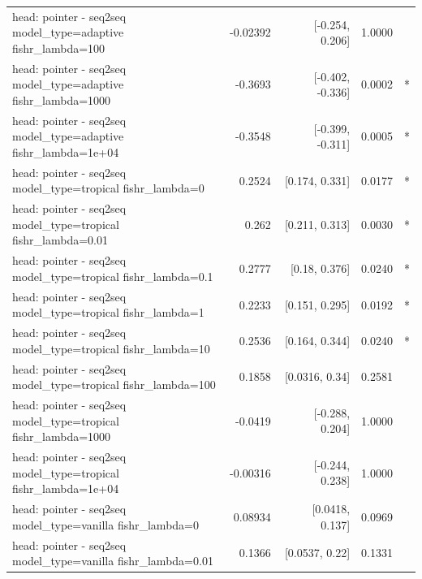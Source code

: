 \documentclass[10pt]{article}
\makeatletter
\newcommand{\stackcell}[1]{\begin{tabular}[t]{@{}l@{}}#1\end{tabular}}
\makeatother
\begin{document}
{\begin{longtable}{lrrrl}
\stackcell{head: pointer - seq2seq\\\footnotesize model\_type=adaptive fishr\_lambda=100 } & -0.02392 & [-0.254, 0.206] & 1.0000 & \\
\stackcell{head: pointer - seq2seq\\\footnotesize model\_type=adaptive fishr\_lambda=1000 } & -0.3693 & [-0.402, -0.336] & 0.0002 & *\\
\stackcell{head: pointer - seq2seq\\\footnotesize model\_type=adaptive fishr\_lambda=1e+04 } & -0.3548 & [-0.399, -0.311] & 0.0005 & *\\
\stackcell{head: pointer - seq2seq\\\footnotesize model\_type=tropical fishr\_lambda=0 } & 0.2524 & [0.174, 0.331] & 0.0177 & *\\
\stackcell{head: pointer - seq2seq\\\footnotesize model\_type=tropical fishr\_lambda=0.01 } & 0.262 & [0.211, 0.313] & 0.0030 & *\\
\stackcell{head: pointer - seq2seq\\\footnotesize model\_type=tropical fishr\_lambda=0.1 } & 0.2777 & [0.18, 0.376] & 0.0240 & *\\
\stackcell{head: pointer - seq2seq\\\footnotesize model\_type=tropical fishr\_lambda=1 } & 0.2233 & [0.151, 0.295] & 0.0192 & *\\
\stackcell{head: pointer - seq2seq\\\footnotesize model\_type=tropical fishr\_lambda=10 } & 0.2536 & [0.164, 0.344] & 0.0240 & *\\
\stackcell{head: pointer - seq2seq\\\footnotesize model\_type=tropical fishr\_lambda=100 } & 0.1858 & [0.0316, 0.34] & 0.2581 & \\
\stackcell{head: pointer - seq2seq\\\footnotesize model\_type=tropical fishr\_lambda=1000 } & -0.0419 & [-0.288, 0.204] & 1.0000 & \\
\stackcell{head: pointer - seq2seq\\\footnotesize model\_type=tropical fishr\_lambda=1e+04 } & -0.00316 & [-0.244, 0.238] & 1.0000 & \\
\stackcell{head: pointer - seq2seq\\\footnotesize model\_type=vanilla fishr\_lambda=0 } & 0.08934 & [0.0418, 0.137] & 0.0969 & \\
\stackcell{head: pointer - seq2seq\\\footnotesize model\_type=vanilla fishr\_lambda=0.01 } & 0.1366 & [0.0537, 0.22] & 0.1331 & \\

\end{longtable}}
\end{document}
